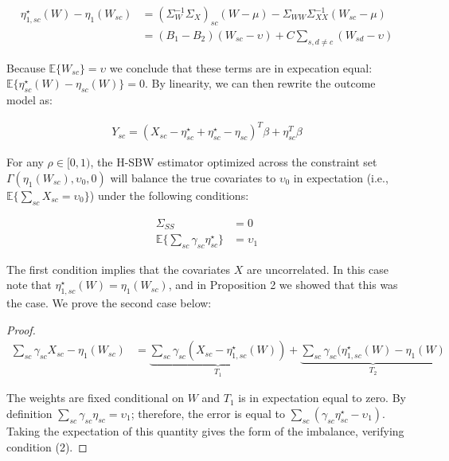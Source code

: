     \begin{align*}
    \eta_{1, sc}^\star(W) - \eta_1(W_{sc}) &= (\Sigma_{W}^{-1}\Sigma_{X})_{sc}(W - \mu) - \Sigma_{WW}\Sigma_{XX}^{-1}(W_{sc} - \mu) \\
    &= (B_1 - B_2)(W_{sc} - \upsilon) + C\sum_{s, d \ne c}(W_{sd} - \upsilon)
    \end{align*}

    Because $\mathbb{E}\{W_{sc}\} = \upsilon$ we conclude that these terms are in expecation equal: $\mathbb{E}\{\eta_{sc}^\star(W) - \eta_{sc}(W)\} = 0$. By linearity, we can then rewrite the outcome model as:
    
    \begin{align*}
    Y_{sc} = (X_{sc} - \eta^\star_{sc} + \eta^\star_{sc} - \eta_{sc})^T\beta + \eta^T_{sc}\beta
    \end{align*}


\begin{proposition}
For any $\rho \in [0, 1)$, the H-SBW estimator optimized across the constraint set $\Gamma(\eta_1(W_{sc}), \upsilon_0, 0)$ will balance the true covariates to $\upsilon_0$ in expectation (i.e., $\mathbb{E}\{\sum_{sc}X_{sc} = \upsilon_0\}$) under the following conditions:

\begin{align}
    \Sigma_{SS} &= 0 \\
    \mathbb{E}\{\sum_{sc}\gamma_{sc}\eta^\star_{sc}\} &= \upsilon_1
\end{align}
\end{proposition}

The first condition implies that the covariates $X$ are uncorrelated. In this case note that $\eta^\star_{1, sc}(W) = \eta_1(W_{sc})$, and in Proposition 2 we showed that this was the case. We prove the second case below:

\begin{proof}
    \begin{align*}
    \sum_{sc}\gamma_{sc}X_{sc} - \eta_1(W_{sc}) &= \underbrace{\sum_{sc}\gamma_{sc}(X_{sc} - \eta^\star_{1, sc}(W))}_{T_1} + \underbrace{\sum_{sc}\gamma_{sc}(\eta^\star_{1,sc}(W) - \eta_{1}(W)}
    _{T_2}
    \end{align*}
    
    The weights are fixed conditional on $W$ and $T_1$ is in expectation equal to zero. By definition $\sum_{sc}\gamma_{sc}\eta_{sc} = \upsilon_1$; therefore, the error is equal to $\sum_{sc}(\gamma_{sc}\eta^\star_{sc} - \upsilon_1)$. Taking the expectation of this quantity gives the form of the imbalance, verifying condition (2).
\end{proof}

